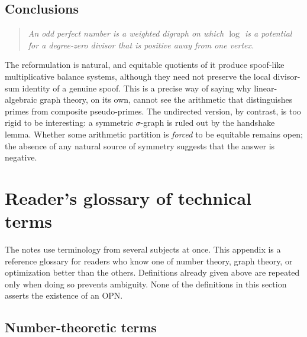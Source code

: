 \documentclass[11pt]{article}
\theoremstyle{definition}
\theoremstyle{remark}
\begin{document}
\subsection{Conclusions}

\begin{quote}
\emph{An odd perfect number is a weighted digraph on which $\log$ is a
potential for a degree-zero divisor that is positive away from one
vertex.}
\end{quote}
The reformulation is natural, and equitable quotients of it produce
spoof-like multiplicative balance systems, although they need not preserve
the local divisor-sum identity of a genuine spoof.  This is a precise way of
saying why linear-algebraic graph theory, on its own, cannot see the
arithmetic that distinguishes primes from composite pseudo-primes.  The
undirected version, by contrast, is too rigid to be interesting: a symmetric
$\sigma$-graph is ruled out by the handshake lemma.  Whether some arithmetic
partition is \emph{forced} to be equitable remains open; the absence of any
natural source of symmetry suggests that the answer is negative.


\appendix
\section{Reader's glossary of technical terms}\label{sec:glossary}

The notes use terminology from several subjects at once.  This appendix is a
reference glossary for readers who know one of number theory, graph theory, or
optimization better than the others.  Definitions already given above are
repeated only when doing so prevents ambiguity.  None of the definitions in
this section asserts the existence of an OPN.

\subsection*{Number-theoretic terms}
\end{document}
